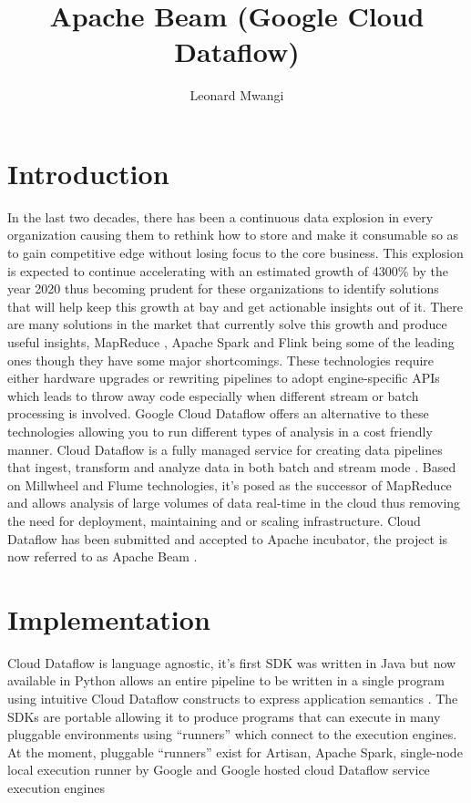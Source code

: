 \documentclass[9pt,twocolumn,twoside]{../../styles/osajnl}
\title{Apache Beam (Google Cloud Dataflow)}
\author[1]{Leonard Mwangi}
\affil[1]{School of Informatics and Computing, Bloomington, IN 47408,
  U.S.A.}
\affil[*]{Corresponding authors: lmwangi@iu.edu}
\begin{document}
\maketitle

\section{Introduction}

In the last two decades, there has been a continuous data explosion in
every organization causing them to rethink how to store and make it
consumable so as to gain competitive edge without losing focus to the
core business. This explosion is expected to continue accelerating
with an estimated growth of 4300\% by the year 2020 \cite{www.bigdata}
thus becoming prudent for these organizations to identify solutions
that will help keep this growth at bay and get actionable insights out
of it. There are many solutions in the market that currently solve
this growth and produce useful insights, MapReduce
\cite{www-mapreduce}, Apache Spark \cite{www-spark} and Flink
\cite{www-flink} being some of the leading ones though they have some
major shortcomings. These technologies require either hardware
upgrades \cite{www-upgrademr} or rewriting pipelines to adopt
engine-specific APIs which leads to throw away code especially when
different stream or batch processing is involved. Google Cloud
Dataflow offers an alternative to these technologies allowing you to
run different types of analysis in a cost friendly manner.  Cloud
Dataflow is a fully managed service for creating data pipelines that
ingest, transform and analyze data in both batch and stream mode
\cite{www-streammode}. Based on Millwheel \cite{millwheel} and Flume
\cite{www-flume} technologies, it’s posed as the successor of
MapReduce and allows analysis of large volumes of data real-time in
the cloud thus removing the need for deployment, maintaining and or
scaling infrastructure.  Cloud Dataflow has been submitted and
accepted to Apache incubator, the project is now referred to as Apache
Beam \cite{www-beamincubate}.

\section{Implementation}

Cloud Dataflow is language agnostic, it’s first SDK was written in
Java \cite{www-javasdk} but now available in Python
\cite{www-pythonsdk} allows an entire pipeline to be written in a
single program using intuitive Cloud Dataflow constructs to express
application semantics \cite{www-dataflowconstructs}. The SDKs are
portable allowing it to produce programs that can execute in many
pluggable environments using “runners” which connect to the execution
engines. At the moment, pluggable “runners” exist for Artisan, Apache
Spark, single-node local execution runner by Google and Google hosted
cloud Dataflow service execution engines
\end{document}
